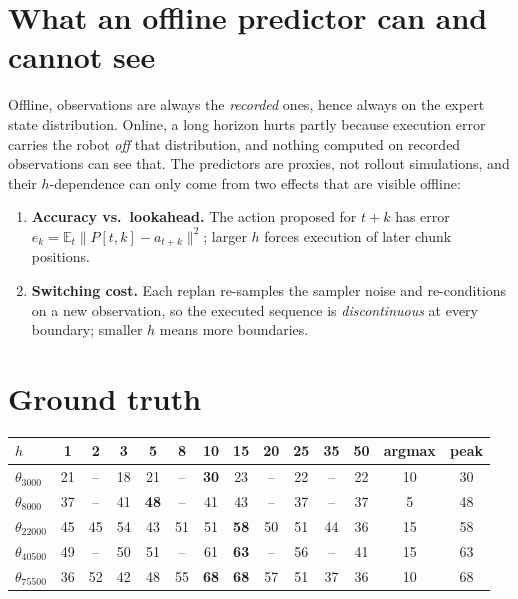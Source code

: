 \documentclass[11pt]{article}
\begin{document}
\section{What an offline predictor can and cannot see}
\label{sec:caveat}

Offline, observations are always the \emph{recorded} ones, hence always on the expert state
distribution. Online, a long horizon hurts partly because execution error carries the robot
\emph{off} that distribution, and nothing computed on recorded observations can see that. The
predictors are proxies, not rollout simulations, and their $h$-dependence can only come from two
effects that are visible offline:

\begin{enumerate}[label=(\roman*)]
  \item \textbf{Accuracy vs.\ lookahead.} The action proposed for $t+k$ has error
        $e_k = \mathbb{E}_t \lVert P[t,k]-a_{t+k}\rVert^2$; larger $h$ forces execution of later
        chunk positions.
  \item \textbf{Switching cost.} Each replan re-samples the sampler noise and re-conditions on a new
        observation, so the executed sequence is \emph{discontinuous} at every boundary; smaller $h$
        means more boundaries.
\end{enumerate}

\section{Ground truth}

\begin{center}
\begin{tabular}{lccccccccccc|cc}
\toprule
$h$ & 1 & 2 & 3 & 5 & 8 & 10 & 15 & 20 & 25 & 35 & 50 & argmax & peak\\
\midrule
$\theta_{3000}$  & 21 & -- & 18 & 21 & -- & \textbf{30} & 23 & -- & 22 & -- & 22 & 10 & 30\\
$\theta_{8000}$  & 37 & -- & 41 & \textbf{48} & -- & 41 & 43 & -- & 37 & -- & 37 & 5 & 48\\
$\theta_{22000}$ & 45 & 45 & 54 & 43 & 51 & 51 & \textbf{58} & 50 & 51 & 44 & 36 & 15 & 58\\
$\theta_{40500}$ & 49 & -- & 50 & 51 & -- & 61 & \textbf{63} & -- & 56 & -- & 41 & 15 & 63\\
$\theta_{75500}$ & 36 & 52 & 42 & 48 & 55 & \textbf{68} & \textbf{68} & 57 & 51 & 37 & 36 & 10 & 68\\
\bottomrule
\end{tabular}
\end{center}
\end{document}
